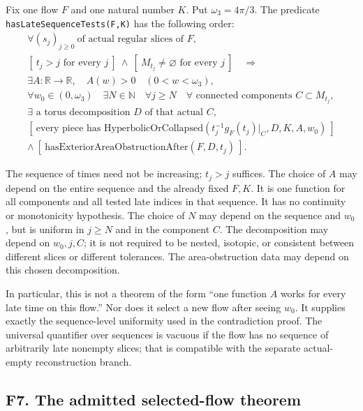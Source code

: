 \documentclass[
  letterpaper,
  11pt]{article}
\begin{document}
Fix one flow \(F\) and one natural number \(K\). Put
\(\omega_3=4\pi/3\). The predicate
{\small\texttt{has\allowbreak{}Late\allowbreak{}Sequence\allowbreak{}Tests(F,K)}}
has the following order: \[
 \begin{gathered}
 \forall (s_j)_{j\geq0}\ \text{of actual regular slices of }F,\\
 [\ t_j>j\text{ for every }j\ ]\ \land\
 [\ M_{t_j}\ne\varnothing\text{ for every }j\ ]\quad\Longrightarrow\\
 \exists A:\mathbb R\to\mathbb R,
 \quad A(w)>0\quad(0<w<\omega_3),\\
 \forall w_0\in(0,\omega_3)\quad\exists N\in\mathbb N\quad
 \forall j\geq N\quad\forall\text{ connected components }C\subset M_{t_j},\\
 \exists\text{ a torus decomposition }D\text{ of that actual }C,\\
 [\ \text{every piece has }\mathrm{HyperbolicOrCollapsed}
       (t_j^{-1}g_F(t_j)|_C,D,K,A,w_0)\ ]\\
 \land\ [\ \mathrm{hasExteriorAreaObstructionAfter}(F,D,t_j)\ ].
 \end{gathered}
\]

The sequence of times need not be increasing; \(t_j>j\) suffices. The
choice of \(A\) may depend on the entire sequence and the already fixed
\(F,K\). It is one function for all components and all tested late
indices in that sequence. It has no continuity or monotonicity
hypothesis. The choice of \(N\) may depend on the sequence and \(w_0\),
but is uniform in \(j\geq N\) and in the component \(C\). The
decomposition may depend on \(w_0,j,C\); it is not required to be
nested, isotopic, or consistent between different slices or different
tolerances. The area-obstruction data may depend on this chosen
decomposition.

In particular, this is not a theorem of the form ``one function \(A\)
works for every late time on this flow.'' Nor does it select a new flow
after seeing \(w_0\). It supplies exactly the sequence-level uniformity
used in the contradiction proof. The universal quantifier over sequences
is vacuous if the flow has no sequence of arbitrarily late nonempty
slices; that is compatible with the separate actual-empty reconstruction
branch.

\subsection{F7. The admitted selected-flow
theorem}\label{f7-selected-flow}
\end{document}
